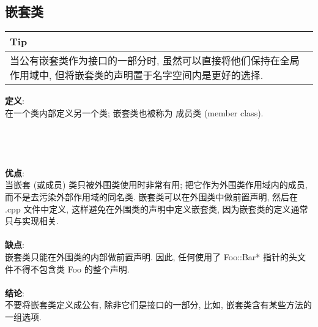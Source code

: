 \documentclass[a4paper,11pt,CJK]{article}
\begin{document}
\begin{CJK}{UTF8}{gbsn}
\subsection{嵌套类}
\begin{table}[htbp]
\flushleft
\begin{tabular}{p{400pt}}
\toprule
\rowcolor[gray]{.8} Tip \\
\midrule
当公有嵌套类作为接口的一部分时, 虽然可以直接将他们保持在全局作用域中, 但将嵌套类的声明置于名字空间内是更好的选择. \\
\bottomrule
\end{tabular}
\end{table}
\noindent
\textbf{定义}: \\在一个类内部定义另一个类; 嵌套类也被称为 成员类 (member class).\\
\\
\\
\\
\\
\textbf{优点}:\\
\indent 当嵌套 (或成员) 类只被外围类使用时非常有用; 把它作为外围类作用域内的成员, 而不是去污染外部作用域的同名类. 嵌套类可以在外围类中做前置声明, 然后在 .cpp 文件中定义, 这样避免在外围类的声明中定义嵌套类, 因为嵌套类的定义通常只与实现相关.\\
\\
\textbf{缺点}:\\
\indent 嵌套类只能在外围类的内部做前置声明. 因此, 任何使用了 Foo::Bar* 指针的头文件不得不包含类 Foo 的整个声明.\\
\\
\textbf{结论}:\\
\indent 不要将嵌套类定义成公有, 除非它们是接口的一部分, 比如, 嵌套类含有某些方法的一组选项.\\


\end{CJK}
\end{document}
